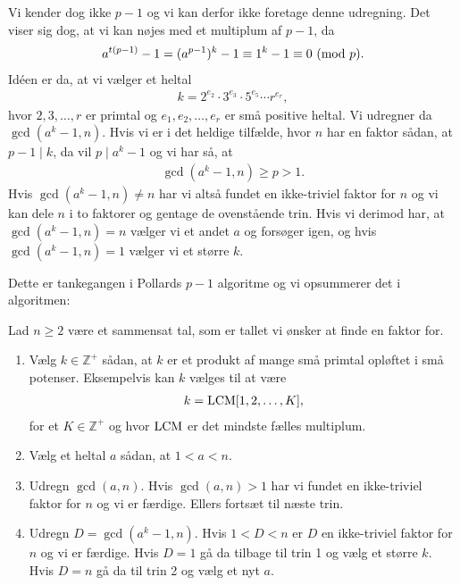 Vi kender dog ikke $p-1$ og vi kan derfor ikke foretage denne udregning. Det viser sig dog, at vi kan nøjes med et multiplum af $p-1$, da
\begin{align*}
	a^{t(p-1)} - 1 = (a^{p-1})^k - 1 \equiv 1^k - 1 \equiv 0 \ (\mathrm{mod} \ p).
\end{align*}
Idéen er da, at vi vælger et heltal
\begin{align*}
	k = 2^{e_2} \cdot 3^{e_3} \cdot 5^{e_5} \cdots r^{e_r},
\end{align*}
hvor $2, 3, \ldots, r$ er primtal og $e_1, e_2, \ldots, e_r$ er små positive heltal. Vi udregner da $\gcd(a^k - 1, n)$. Hvis vi er i det heldige tilfælde, hvor $n$ har en faktor sådan, at $p-1 \mid k$, da vil $p \mid a^k - 1$ og
vi har så, at
\begin{align*}
	\gcd(a^k - 1, n) \geq p > 1.
\end{align*}
Hvis $\gcd(a^k - 1, n) \neq n$ har vi altså fundet en ikke-triviel faktor for $n$ og vi kan dele $n$ i to faktorer og gentage de ovenstående trin. Hvis vi derimod har, at $\gcd(a^k -1, n) = n$ vælger vi et andet $a$ og forsøger igen, og hvis $\gcd(a^k-1,n)=1$ vælger vi et større $k$.

Dette er tankegangen i Pollards $p-1$ algoritme og vi opsummerer det i algoritmen:

\begin{algorithm}
Lad $n \geq 2$ være et sammensat tal, som er tallet vi ønsker at 
finde en faktor for.
\begin{enumerate}
	\item Vælg $k \in \mathbb{Z}^+$ sådan, at $k$ er et produkt
	af mange små primtal opløftet i små potenser. Eksempelvis kan $k$ vælges til at være
	\begin{align*}
		k = \mathrm{LCM} [1, 2, \ldots, K],
	\end{align*}
	for et $K \in \mathbb{Z}^+$ og hvor $\mathrm{LCM}$ er det mindste fælles multiplum.
	\item Vælg et heltal $a$ sådan, at $1 < a <n$.
	\item Udregn $\gcd(a, n)$. Hvis $\gcd(a, n) > 1$ har vi fundet en
	ikke-triviel faktor for $n$ og vi er færdige. Ellers fortsæt til næste
	trin.
	\item Udregn $D = \gcd(a^k - 1, n)$. Hvis $1 < D < n$ er $D$ en ikke-triviel
	faktor for $n$ og vi er færdige. Hvis $D = 1$ gå da tilbage til trin 1
	og vælg et større $k$. Hvis $D = n$ gå da til trin 2 og vælg et nyt $a$. 
\end{enumerate}
\end{algorithm}


